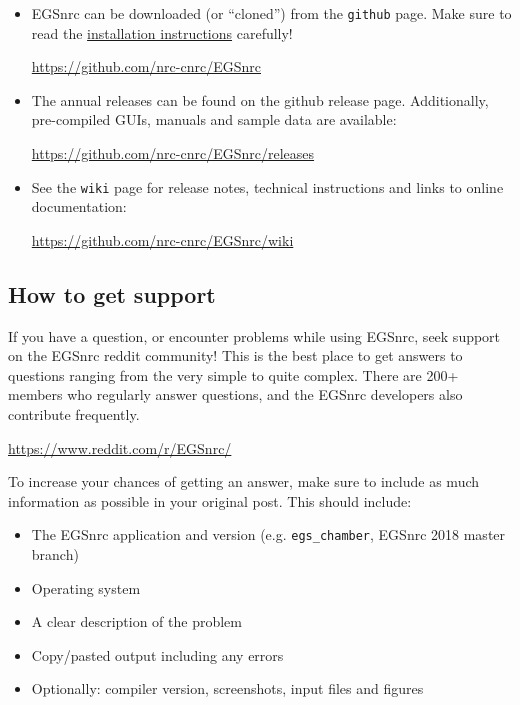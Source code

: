 \documentclass[12pt,twoside]{article}
\begin{document}
\begin{itemize}
\item EGSnrc can be downloaded (or ``cloned'') from the \Verb+github+ page. Make sure
to read the \href{https://github.com/nrc-cnrc/EGSnrc/wiki/Installation-overview}{installation instructions} carefully!

\href{https://github.com/nrc-cnrc/EGSnrc}{https://github.com/nrc-cnrc/EGSnrc}

\item The annual releases can be found on the github release page. Additionally,
pre-compiled GUIs, manuals and sample data are available:

\href{https://github.com/nrc-cnrc/EGSnrc/releases}{https://github.com/nrc-cnrc/EGSnrc/releases}

\item See the \Verb+wiki+ page for release notes, technical instructions and links to online documentation:

\href{https://github.com/nrc-cnrc/EGSnrc/wiki}{https://github.com/nrc-cnrc/EGSnrc/wiki}
\end{itemize}

\subsection{How to get support}
If you have a question, or encounter problems while using EGSnrc,
seek support on the EGSnrc reddit community! This is the best place
to get answers to questions ranging from the very simple to quite
complex. There are 200+ members who regularly answer questions, and
the EGSnrc developers also contribute frequently.

\href{https://www.reddit.com/r/EGSnrc/}{https://www.reddit.com/r/EGSnrc/}

To increase your chances of getting an answer, make sure to include as much information as possible in your original post. This should include:
\begin{itemize}
\item The EGSnrc application and version (e.g. \Verb+egs_chamber+, EGSnrc 2018 master branch)
\item Operating system
\item A clear description of the problem
\item Copy/pasted output including any errors
\item Optionally: compiler version, screenshots, input files and figures
\end{itemize}
\end{document}
